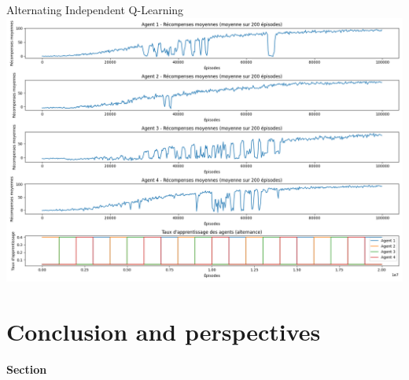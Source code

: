 \documentclass[aspectratio=169,xcolor=dvipsnames]{beamer}
\begin{document}
\begin{frame}{Alternating Independent Q-Learning}
    \centering
    \includegraphics[width=0.9\paperwidth,height=0.75\paperheight,keepaspectratio]{images/alt_learning.png}
    
    \vspace{1em}
\end{frame}


\section{Conclusion and perspectives}

\begin{frame}[plain]
    \vspace{0.15\textheight}
    \begin{center}
        {\bfseries Section \thesection} 
        
        \vspace{0.5cm} 
        
        {\Large\bfseries\insertsectionhead} 
    \end{center}
\end{frame}

\end{document}
